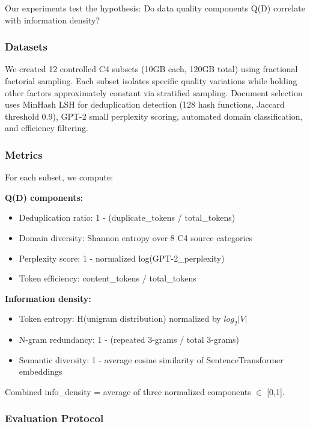 
Our experiments test the hypothesis: Do data quality components Q(D) correlate with information density?

\subsubsection{Datasets}

We created 12 controlled C4 subsets (10GB each, 120GB total) using fractional factorial sampling. Each subset isolates specific quality variations while holding other factors approximately constant via stratified sampling. Document selection uses MinHash LSH for deduplication detection (128 hash functions, Jaccard threshold 0.9), GPT-2 small perplexity scoring, automated domain classification, and efficiency filtering.

\subsubsection{Metrics}

For each subset, we compute:

\textbf{Q(D) components:}
\begin{itemize}
\item Deduplication ratio: 1 - (duplicate\_tokens / total\_tokens)
\item Domain diversity: Shannon entropy over 8 C4 source categories
\item Perplexity score: 1 - normalized log(GPT-2\_perplexity)
\item Token efficiency: content\_tokens / total\_tokens
\end{itemize}

\textbf{Information density:}
\begin{itemize}
\item Token entropy: H(unigram distribution) normalized by $log_{2}|V|$
\item N-gram redundancy: 1 - (repeated 3-grams / total 3-grams)
\item Semantic diversity: 1 - average cosine similarity of SentenceTransformer embeddings
\end{itemize}

Combined info\_density = average of three normalized components $\in$ [0,1].

\subsubsection{Evaluation Protocol}

